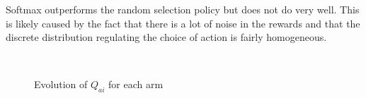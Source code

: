 \documentclass[a4paper]{article}
\begin{document}
Softmax outperforms the random selection policy but does not do very well. 
This is likely caused by the fact that there is a lot of noise in the rewards
and that the discrete distribution regulating the choice of action is fairly
homogeneous. 

\begin{figure}[H]
	\centering
	\\
	\caption{Evolution of $Q_{ai}$ for each arm}
	\label{ex11q}
\end{figure}
\end{document}
